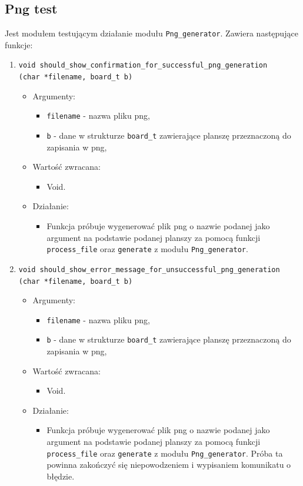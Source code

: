\documentclass[a4paper,11pt, notitlepage ]{article}
\begin{document}
\subsection{Png test}
Jest modułem testującym działanie modułu \verb+Png_generator+. Zawiera następujące funkcje:
\begin{enumerate}

\item \verb+void should_show_confirmation_for_successful_png_generation+\\\verb+(char *filename, board_t b)+
\begin{itemize}
\item Argumenty:
\begin{itemize}
\item \verb+filename+ - nazwa pliku png,
\item \verb+b+ - dane w strukturze \verb+board_t+ zawierające planszę przeznaczoną do zapisania w png,
\end{itemize}
\item Wartość zwracana:
\begin{itemize}
\item Void.
\end{itemize}
\item Działanie:
\begin{itemize}
\item Funkcja próbuje wygenerować plik png o nazwie podanej jako argument na podstawie podanej planszy za pomocą funkcji \verb+process_file+ oraz \verb+generate+ z modułu \verb+Png_generator+.
\end{itemize}
\end{itemize}

\item \verb+void should_show_error_message_for_unsuccessful_png_generation+\\\verb+(char *filename, board_t b)+
\begin{itemize}
\item Argumenty:
\begin{itemize}
\item \verb+filename+ - nazwa pliku png,
\item \verb+b+ - dane w strukturze \verb+board_t+ zawierające planszę przeznaczoną do zapisania w png,
\end{itemize}
\item Wartość zwracana:
\begin{itemize}
\item Void.
\end{itemize}
\item Działanie:
\begin{itemize}
\item Funkcja próbuje wygenerować plik png o nazwie podanej jako argument na podstawie podanej planszy za pomocą funkcji \verb+process_file+ oraz \verb+generate+ z modułu \verb+Png_generator+. Próba ta powinna zakończyć się niepowodzeniem i wypisaniem komunikatu o błędzie.
\end{itemize}
\end{itemize}


\end{enumerate}
\end{document}
